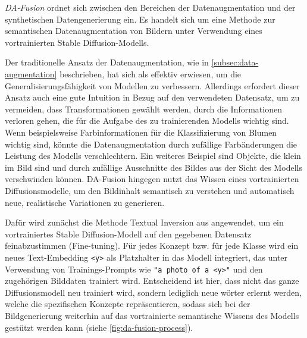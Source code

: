 \emph{DA-Fusion} \parencite{Trabucco2023dafusion} ordnet sich zwischen den Bereichen der Datenaugmentation und der synthetischen Datengenerierung ein. Es handelt sich um eine Methode zur semantischen Datenaugmentation von Bildern unter Verwendung eines vortrainierten Stable Diffusion-Modells. 

Der traditionelle Ansatz der Datenaugmentation, wie in \autoref{subsec:data-augmentation} beschrieben, hat sich als effektiv erwiesen, um die Generalisierungsfähigkeit von Modellen zu verbessern. Allerdings erfordert dieser Ansatz auch eine gute Intuition in Bezug auf den verwendeten Datensatz, um zu vermeiden, dass Transformationen gewählt werden, durch die Informationen verloren gehen, die für die Aufgabe des zu trainierenden Modells wichtig sind. Wenn beispielsweise Farbinformationen für die Klassifizierung von Blumen wichtig sind, könnte die Datenaugmentation durch zufällige Farbänderungen die Leistung des Modells verschlechtern. Ein weiteres Beispiel sind Objekte, die klein im Bild sind und durch zufällige Ausschnitte des Bildes aus der Sicht des Modells verschwinden können. DA-Fusion hingegen nutzt das Wissen eines vortrainierten Diffusionsmodelle, um den Bildinhalt semantisch zu verstehen und automatisch neue, realistische Variationen zu generieren.


Dafür wird zunächst die Methode Textual Inversion aus \parencite{Gal2022textualinversion} angewendet, um ein vortrainiertes Stable Diffusion-Modell auf den gegebenen Datensatz feinabzustimmen (Fine-tuning). Für jedes Konzept bzw. für jede Klasse wird ein neues Text-Embedding \lstinline|<y>| als Platzhalter in das Modell integriert, das unter Verwendung von Trainings-Prompts wie \lstinline|"a photo of a <y>"| und den zugehörigen Bilddaten trainiert wird. Entscheidend ist hier, dass nicht das ganze Diffusionsmodell neu trainiert wird, sondern lediglich neue wörter erlernt werden, welche die spezifischen Konzepte repräsentieren, sodass sich bei der Bildgenerierung weiterhin auf das vortrainierte semantische Wissens des Modells gestützt werden kann (siehe \autoref{fig:da-fusion-process}).

